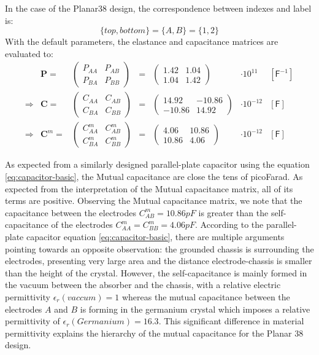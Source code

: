 In the case of the Planar38 design, the correspondence between indexes and label is:
$$\{ top, bottom \} = \{A,B\} = \{ 1, 2\}$$
With the default parameters, the elastance and capacitance matrices are evaluated to:
\begin{equation} 
\label{eq:planar38-matrix-evaluation}
\begin{array}{rrccclc}
 & \bm{P} = &
 \begin{pmatrix}
P_{AA} & P_{AB} \\ 
P_{BA} & P_{BB}
\end{pmatrix}
&=&
\begin{pmatrix}
1.42 & 1.04 \\
1.04 & 1.42
\end{pmatrix}
& \cdot 10^{11} & [\textsf{F}^{-1}] \\
\Rightarrow & \bm{C} = &
\begin{pmatrix}
C_{AA} & C_{AB} \\ 
C_{BA} & C_{BB}
\end{pmatrix}
&=&
\begin{pmatrix}
14.92 & -10.86 \\
-10.86 & 14.92
\end{pmatrix}
& \cdot 10^{-12} & [\textsf{F}] \\
\Rightarrow & \bm{C}^m = &
\begin{pmatrix}
C_{AA}^m & C_{AB}^m \\ 
C_{BA}^m & C_{BB}^m
\end{pmatrix}
&=&
\begin{pmatrix}
4.06 & 10.86 \\
10.86 & 4.06
\end{pmatrix}
& \cdot 10^{-12} & [\textsf{F}]
\end{array}
\end{equation}
 
As expected from a similarly designed parallel-plate capacitor using the equation \ref{eq:capacitor-basic}, the Mutual capacitance are close the tens of picoFarad. As expected from the interpretation of the Mutual capacitance matrix, all of its terms are positive. Observing the Mutual capacitance matrix, we note that the capacitance between the electrodes $C_{AB}^m=10.86pF$ is greater than the self-capacitance of the electrodes $C_{AA}^m = C_{BB}^m = 4.06pF$. According to the parallel-plate capacitor equation \ref{eq:capacitor-basic}, there are multiple arguments pointing towards an opposite observation: the grounded chassis is surrounding the electrodes, presenting very large area and the distance electrode-chassis is smaller than the height of the crystal. However, the self-capacitance is mainly formed in the vacuum between the absorber and the chassis, with a relative electric permittivity $\epsilon_r(vaccum)=1$ whereas the mutual capacitance between the electrodes $A$ and $B$ is forming in the germanium crystal which imposes a relative permittivity of $\epsilon_r(Germanium)=16.3$. This  significant difference in material permittivity explains the hierarchy of the mutual capacitance for the Planar 38 design.

